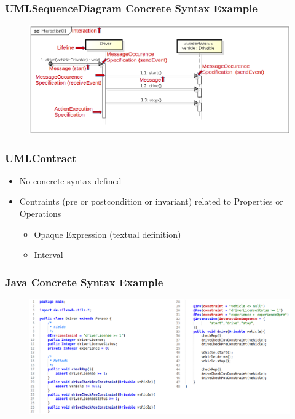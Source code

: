 \documentclass{beamer}
\begin{document}
\begin{frame}[t]
	\frametitle{UMLSequenceDiagram Concrete Syntax Example}
	\begin{figure}[H]
   		\includegraphics[width=\textwidth]{umlSequenceDiagramExample01_Diagram}
	\end{figure}
\end{frame}

\begin{frame}
	\frametitle{UMLContract}
	\begin{itemize}
		\item No concrete syntax defined
		\item Contraints (pre or postcondition or invariant) related to Properties or Operations
		\begin{itemize}
			\item Opaque Expression (textual definition)
			\item Interval
		\end{itemize}	
	\end{itemize}
\end{frame}

\begin{frame}
	\frametitle{Java Concrete Syntax Example}
	\nocite{heidenreich2009jamopp}
	\begin{figure}[H]
   		\includegraphics[width=\textwidth]{javaMetamodelExample01_Text}
	\end{figure}	
\end{frame}
\end{document}

